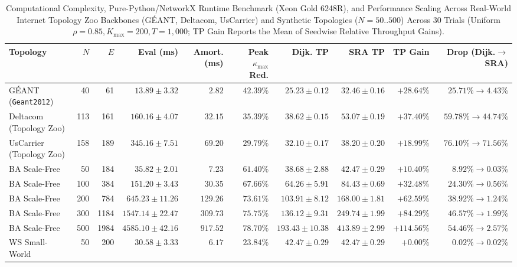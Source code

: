 \documentclass[journal]{IEEEtran}
\theoremstyle{plain}
\theoremstyle{definition}
\newcommand{\rev}[1]{{\color{blue}#1}}
\begin{document}
\begin{table}[t!]
\centering
\caption{\rev{Computational Complexity, Pure-Python/NetworkX Runtime Benchmark (Xeon Gold 6248R), and Performance Scaling Across Real-World Internet Topology Zoo Backbones (G\'EANT, Deltacom, UsCarrier) and Synthetic Topologies ($N=50..500$) Across 30 Trials (Uniform $\rho=0.85, K_{\max}=200, T=1{,}000$; TP Gain Reports the Mean of Seedwise Relative Throughput Gains).}}
\label{tab:scalability_table}
\renewcommand{\arraystretch}{1.04}
\scriptsize\setlength{\tabcolsep}{3.0pt}
\begin{tabular}{|l|r|r|r|r|r|r|r|r|r|}
\hline
\textbf{Topology} & \textbf{$N$} & \textbf{$E$} & \textbf{Eval (ms)} & \textbf{Amort. (ms)} & \textbf{Peak $\kappa_{\max}$ Red.} & \textbf{Dijk. TP} & \textbf{SRA TP} & \textbf{TP Gain} & \textbf{Drop (Dijk.$\to$SRA)} \\
\hline\hline
G\'EANT (\texttt{Geant2012}) & 40 & 61 & $13.89 \pm 3.32$ & $2.82$ & $42.39\%$ & $25.23 \pm 0.12$ & $32.46 \pm 0.16$ & $\mathbf{+28.64\%}$ & $25.71\% \to 4.43\%$ \\
\hline
Deltacom (Topology Zoo) & 113 & 161 & $160.16 \pm 4.07$ & $32.15$ & $35.39\%$ & $38.62 \pm 0.15$ & $53.07 \pm 0.19$ & $\mathbf{+37.40\%}$ & $59.78\% \to 44.74\%$ \\
\hline
UsCarrier (Topology Zoo) & 158 & 189 & $345.16 \pm 7.51$ & $69.20$ & $29.79\%$ & $32.10 \pm 0.17$ & $38.20 \pm 0.20$ & $\mathbf{+18.99\%}$ & $76.10\% \to 71.56\%$ \\
\hline
BA Scale-Free & 50 & 184 & $35.82 \pm 2.01$ & $7.23$ & $61.40\%$ & $38.68 \pm 2.88$ & $42.47 \pm 0.29$ & $+10.40\%$ & $8.92\% \to 0.03\%$ \\
\hline
BA Scale-Free & 100 & 384 & $151.20 \pm 3.43$ & $30.35$ & $67.66\%$ & $64.26 \pm 5.91$ & $84.43 \pm 0.69$ & $+32.48\%$ & $24.30\% \to 0.56\%$ \\
\hline
BA Scale-Free & 200 & 784 & $645.23 \pm 11.26$ & $129.26$ & $73.61\%$ & $103.91 \pm 8.12$ & $168.00 \pm 1.81$ & $+62.59\%$ & $38.92\% \to 1.24\%$ \\
\hline
BA Scale-Free & 300 & 1184 & $1547.14 \pm 22.47$ & $309.73$ & $75.75\%$ & $136.12 \pm 9.31$ & $249.74 \pm 1.99$ & $+84.29\%$ & $46.57\% \to 1.99\%$ \\
\hline
BA Scale-Free & 500 & 1984 & $4585.10 \pm 42.16$ & $917.52$ & $78.70\%$ & $193.43 \pm 10.38$ & $413.89 \pm 2.99$ & $\mathbf{+114.56\%}$ & $\mathbf{54.46\% \to 2.57\%}$ \\
\hline
WS Small-World & 50 & 200 & $30.58 \pm 3.33$ & $6.17$ & $23.84\%$ & $42.47 \pm 0.29$ & $42.47 \pm 0.29$ & $+0.00\%$ & $0.02\% \to 0.02\%$ \\

\end{tabular}
\end{table}
\end{document}
